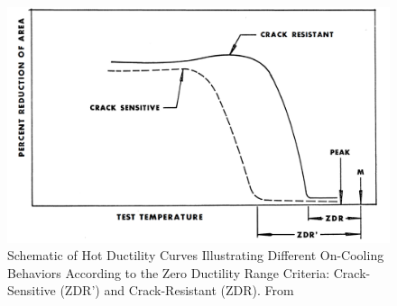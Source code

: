 \begin{figure}
\centering
\includegraphics[width=6in]{figures/zdr-schematic.png}
\caption{Schematic of Hot Ductility Curves Illustrating Different On-Cooling Behaviors According to the Zero Ductility Range Criteria: Crack-Sensitive (ZDR') and Crack-Resistant (ZDR).  From \citet[Fig.~4]{yeniscavich_correlation_1970}}
\label{fig:zdr-schematic}
\end{figure}


